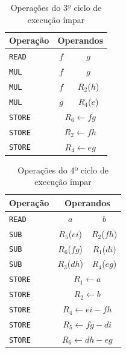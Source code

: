 \begin{multicols}{2}
	\begin{table}[H]
		\centering
		\begin{tabular}{l|c|c}
			Operação & \multicolumn{2}{c}{Operandos} \\
			\hline
			\texttt{READ} & $f$ & $g$ \\
			\hline
			\texttt{MUL} & $f$ & $g$ \\
			\texttt{MUL} & $f$ & $R_2$($h$) \\
			\texttt{MUL} & $g$ & $R_4$($e$) \\
			\hline
			\texttt{STORE} & \multicolumn{2}{c}{$R_6\leftarrow fg$} \\
			\texttt{STORE} & \multicolumn{2}{c}{$R_2\leftarrow fh$} \\
			\texttt{STORE} & \multicolumn{2}{c}{$R_4\leftarrow eg$} \\
		\end{tabular}
		\caption{Operações do 3º ciclo de execução ímpar}
		\label{tab:odd_3}
	\end{table}

	\begin{table}[H]
		\centering
		\begin{tabular}{l|c|c}
			Operação & \multicolumn{2}{c}{Operandos} \\
			\hline
			\texttt{READ} & $a$ & $b$ \\
			\hline
			\texttt{SUB} & $R_5$($ei$) & $R_2$($fh$) \\
			\texttt{SUB} & $R_6$($fg$) & $R_1$($di$) \\
			\texttt{SUB} & $R_3$($dh$) & $R_4$($eg$) \\
			\hline
			\texttt{STORE} & \multicolumn{2}{c}{$R_1\leftarrow a$} \\
			\texttt{STORE} & \multicolumn{2}{c}{$R_2\leftarrow b$} \\
			\texttt{STORE} & \multicolumn{2}{c}{$R_4\leftarrow ei - fh$} \\
			\texttt{STORE} & \multicolumn{2}{c}{$R_5\leftarrow fg - di$} \\
			\texttt{STORE} & \multicolumn{2}{c}{$R_6\leftarrow dh - eg$} \\
		\end{tabular}
		\caption{Operações do 4º ciclo de execução ímpar}
		\label{tab:odd_4}
	\end{table}


\end{multicols}
